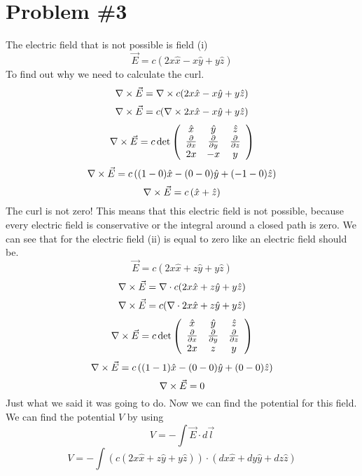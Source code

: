\documentclass[11pt]{article}
\numberwithin{equation}{section}
\newcommand{\grad}{\bold\nabla}
\newcommand{\vecE}{\vec{E}}
\begin{document}
\section{Problem \#3}
The electric field that is not possible is field (i)
\begin{equation}
\vecE = c(2x\hat{x} - x\hat{y} + y \hat{z})
\label{vecI}
\end{equation}
To find out why we need to calculate the curl.
$$\grad\times \vecE = \grad \times c(2x\hat{x} - x\hat{y} + y \hat{z})$$
$$\grad\times\vecE = c(\grad \times 2x\hat{x} - x\hat{y} + y \hat{z})$$
$$\grad\times\vecE = c\det\left( \begin{array}{ccc}
			\hat{x} &\hat{y} &\hat{z}\\
			\frac{\partial}{\partial x} &\frac{\partial}{\partial y} &\frac{\partial}{\partial z}\\
			2x &-x &y\\
			\end{array}\right)$$
$$\grad\times \vecE = c\left((1-0)\hat{x} - (0-0)\hat{y} + (-1-0)\hat{z}\right)$$
$$\grad\times \vecE = c\left(\hat{x} + \hat{z}\right)$$
The curl is not zero! This means that this electric field is not possible, because every electric field is conservative or the integral around a closed path is zero. We can see that for the electric field (ii) is equal to zero like an electric field should be.
\begin{equation}
\vecE = c(2x\hat{x} + z\hat{y} + y \hat{z})
\label{vecII}
\end{equation}
$$\grad\times \vecE = \grad \cdot c(2x\hat{x} + z\hat{y} + y \hat{z})$$
$$\grad\times \vecE = c(\grad \cdot 2x\hat{x} + z\hat{y} + y \hat{z})$$
$$\grad\times \vecE = c\det\left( \begin{array}{ccc}
			\hat{x} &\hat{y} &\hat{z}\\
			\frac{\partial}{\partial x} &\frac{\partial}{\partial y} &\frac{\partial}{\partial z}\\
			2x &z &y\\
			\end{array}\right)$$
$$\grad\times \vecE = c\left((1-1)\hat{x} - (0-0)\hat{y} + (0-0)\hat{z}\right)$$
$$\grad\times \vecE = 0$$
Just what we said it was going to do. Now we can find the potential for this field. We can find the potential $V$ by using
\begin{equation}
V = -\int \vecE\cdot d\vec{l}
\label{potfE}
\end{equation}
$$V = -\int (c(2x\hat{x} + z\hat{y} + y \hat{z}))\cdot(dx\hat{x}+dy\hat{y}+dz\hat{z})$$
\end{document}
